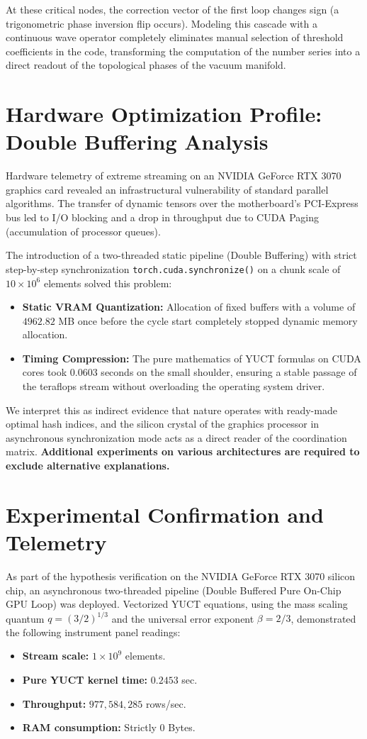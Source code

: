 \documentclass[11pt,a4paper]{article}
\begin{document}
	At these critical nodes, the correction vector of the first loop changes sign (a trigonometric phase inversion flip occurs). Modeling this cascade with a continuous wave operator completely eliminates manual selection of threshold coefficients in the code, transforming the computation of the number series into a direct readout of the topological phases of the vacuum manifold.
	
	\section{Hardware Optimization Profile: Double Buffering Analysis}
	Hardware telemetry of extreme streaming on an NVIDIA GeForce RTX 3070 graphics card revealed an infrastructural vulnerability of standard parallel algorithms. The transfer of dynamic tensors over the motherboard's PCI-Express bus led to I/O blocking and a drop in throughput due to CUDA Paging (accumulation of processor queues).
	
	The introduction of a two-threaded static pipeline (Double Buffering) with strict step-by-step synchronization \texttt{torch.cuda.synchronize()} on a chunk scale of $10 \times 10^6$ elements solved this problem:
	\begin{itemize}
		\item \textbf{Static VRAM Quantization:} Allocation of fixed buffers with a volume of $4962.82$ MB once before the cycle start completely stopped dynamic memory allocation.
		\item \textbf{Timing Compression:} The pure mathematics of YUCT formulas on CUDA cores took $0.0603$ seconds on the small shoulder, ensuring a stable passage of the teraflops stream without overloading the operating system driver.
	\end{itemize}
	We interpret this as indirect evidence that nature operates with ready-made optimal hash indices, and the silicon crystal of the graphics processor in asynchronous synchronization mode acts as a direct reader of the coordination matrix. \textbf{Additional experiments on various architectures are required to exclude alternative explanations.}
	
	\section{Experimental Confirmation and Telemetry}
	As part of the hypothesis verification on the NVIDIA GeForce RTX 3070 silicon chip, an asynchronous two-threaded pipeline (Double Buffered Pure On-Chip GPU Loop) was deployed. Vectorized YUCT equations, using the mass scaling quantum $q = (3/2)^{1/3}$ and the universal error exponent $\beta = 2/3$, demonstrated the following instrument panel readings:
	\begin{itemize}
		\item \textbf{Stream scale:} $1 \times 10^9$ elements.
		\item \textbf{Pure YUCT kernel time:} $0.2453$ sec.
		\item \textbf{Throughput:} $977,584,285$ rows/sec.
		\item \textbf{RAM consumption:} Strictly $0$ Bytes.
	\end{itemize}
	
\end{document}
